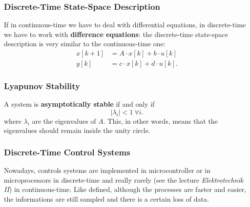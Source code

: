 \documentclass[a4paper,12 pt]{article}
\numberwithin{equation}{section}
\theoremstyle{definition}
\theoremstyle{remark}
\theoremstyle{definition}
\theoremstyle{definition}
\theoremstyle{definition}
\theoremstyle{remark}
\begin{document}
\subsubsection{Discrete-Time State-Space Description}
If in continuous-time we have to deal with differential equations, in discrete-time we have to work with \textbf{difference equations}: the discrete-time state-space description is very similar to the continuous-time one: 
\begin{equation}
\begin{split}
x[k+1]&=A\cdot x[k] +b\cdot u[k]\\
y[k]&=c\cdot x[k] + d \cdot u[k].
\end{split}
\end{equation}
\subsubsection*{Lyapunov Stability}
A system is \textbf{asymptotically stable} if and only if 
\begin{equation}
|\lambda_i|<1 \ \forall i.
\end{equation}
where $\lambda_i$ are the eigenvalues of $A$. This, in other words, means that the eigenvalues should remain inside the unity circle.
\subsubsection{Discrete-Time Control Systems}
Nowadays, controls systems are implemented in microcontroller or in microprocessors in discrete-time and really rarely (see the lecture \textit{Elektrotechnik II}) in continuous-time. Like defined, although the processes are faster and easier, the informations are still sampled and there is a certain loss of data.
\end{document}
